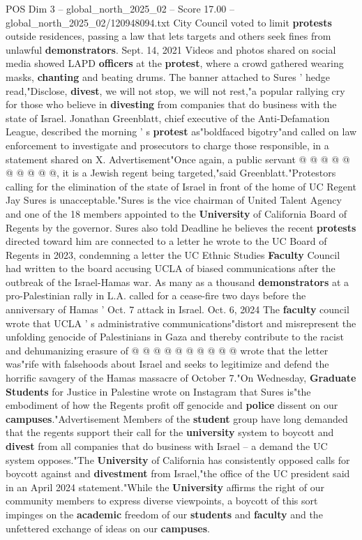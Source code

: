 \begin{textsample}{POS Dim 3 – global\_north\_2025\_02 – Score 17.00 – global\_north\_2025\_02/120948094.txt}
City Council voted to limit \textbf{protests} outside residences, passing a law that lets targets and others seek fines from unlawful \textbf{demonstrators}.
Sept. 14, 2021 Videos and photos shared on social media showed LAPD \textbf{officers} at the \textbf{protest}, where a crowd gathered wearing masks, \textbf{chanting} and beating drums.
The banner attached to Sures ' hedge read,"Disclose, \textbf{divest}, we will not stop, we will not rest,"a popular rallying cry for those who believe in \textbf{divesting} from companies that do business with the state of Israel.
Jonathan Greenblatt, chief executive of the Anti-Defamation League, described the morning ' s \textbf{protest} as"boldfaced bigotry"and called on law enforcement to investigate and prosecutors to charge those responsible, in a statement shared on X.
Advertisement"Once again, a public servant @ @ @ @ @ @ @ @ @ @, it is a Jewish regent being targeted,"said Greenblatt."Protestors calling for the elimination of the state of Israel in front of the home of UC Regent Jay Sures is unacceptable."Sures is the vice chairman of United Talent Agency and one of the 18 members appointed to the \textbf{University} of California Board of Regents by the governor.
Sures also told Deadline he believes the recent \textbf{protests} directed toward him are connected to a letter he wrote to the UC Board of Regents in 2023, condemning a letter the UC Ethnic Studies \textbf{Faculty} Council had written to the board accusing UCLA of biased communications after the outbreak of the Israel-Hamas war.
As many as a thousand \textbf{demonstrators} at a pro-Palestinian rally in L.A. called for a cease-fire two days before the anniversary of Hamas ' Oct. 7 attack in Israel.
Oct. 6, 2024 The \textbf{faculty} council wrote that UCLA ' s administrative communications"distort and misrepresent the unfolding genocide of Palestinians in Gaza and thereby contribute to the racist and dehumanizing erasure of @ @ @ @ @ @ @ @ @ @ wrote that the letter was"rife with falsehoods about Israel and seeks to legitimize and defend the horrific savagery of the Hamas massacre of October 7."On Wednesday, \textbf{Graduate} \textbf{Students} for Justice in Palestine wrote on Instagram that Sures is"the embodiment of how the Regents profit off genocide and \textbf{police} dissent on our \textbf{campuses}."Advertisement Members of the \textbf{student} group have long demanded that the regents support their call for the \textbf{university} system to boycott and \textbf{divest} from all companies that do business with Israel -- a demand the UC system opposes."The \textbf{University} of California has consistently opposed calls for boycott against and \textbf{divestment} from Israel,"the office of the UC president said in an April 2024 statement."While the \textbf{University} affirms the right of our community members to express diverse viewpoints, a boycott of this sort impinges on the \textbf{academic} freedom of our \textbf{students} and \textbf{faculty} and the unfettered exchange of ideas on our \textbf{campuses}.

\end{textsample}

